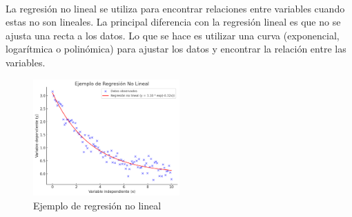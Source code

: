 \documentclass{report}
\begin{document}
        \paragraph*{}
        {
          La regresión no lineal se utiliza para encontrar relaciones entre variables cuando estas no son lineales.
          La principal diferencia con la regresión lineal es que no se ajusta una recta a los datos.
          Lo que se hace es utilizar una curva (exponencial, logarítmica o polinómica) para ajustar los datos y encontrar la relación entre las variables.
          \begin{figure}[H]
            \centering
            \includegraphics[width=0.5\textwidth]{.img/rnl.png}
            \caption{Ejemplo de regresión no lineal}
          \end{figure}
        }
\end{document}
